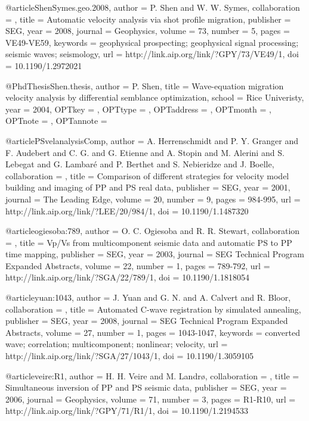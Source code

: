 @article{ShenSymes.geo.2008,
author = {P. Shen and W. W. Symes},
collaboration = {},
title = {Automatic velocity analysis via shot profile migration},
publisher = {SEG},
year = {2008},
journal = {Geophysics},
volume = {73},
number = {5},
pages = {VE49-VE59},
keywords = {geophysical prospecting; geophysical signal processing; seismic waves; seismology},
url = {http://link.aip.org/link/?GPY/73/VE49/1},
doi = {10.1190/1.2972021}
}

@PhdThesis{Shen.thesis,
  author = 	 {P. Shen},
  title = 	 {Wave-equation migration velocity analysis by
                  differential semblance optimization},
  school = 	 {Rice Univeristy},
  year = 	 {2004},
  OPTkey = 	 {},
  OPTtype = 	 {},
  OPTaddress = 	 {},
  OPTmonth = 	 {},
  OPTnote = 	 {},
  OPTannote = 	 {}
}

@article{PSvelanalysisComp,
author = {A. Herrenschmidt and P. Y. Granger and
                  F. Audebert and C. G. and
                  G. Etienne and A. Stopin and M.
                  Alerini and S. Lebegat and G. Lambar\'{e}
                  and P. Berthet and S. Nebieridze and
                  J. Boelle},
collaboration = {},
title = {Comparison of different strategies for velocity model
                  building and imaging of {PP} and {PS} real data},
publisher = {SEG},
year = {2001},
journal = {The Leading Edge},
volume = {20},
number = {9},
pages = {984-995},
url = {http://link.aip.org/link/?LEE/20/984/1},
doi = {10.1190/1.1487320}
}

@article{ogiesoba:789,
author = {O. C. Ogiesoba and R. R. Stewart},
collaboration = {},
title = {Vp/{V}s from multicomponent seismic data and automatic {PS}
                  to {PP} time mapping},
publisher = {SEG},
year = {2003},
journal = {SEG Technical Program Expanded Abstracts},
volume = {22},
number = {1},
pages = {789-792},
url = {http://link.aip.org/link/?SGA/22/789/1},
doi = {10.1190/1.1818054}
}

@article{yuan:1043,
author = {J. Yuan and G. N. and A. Calvert and
                  R. Bloor},
collaboration = {},
title = {Automated {C}-wave registration by simulated annealing},
publisher = {SEG},
year = {2008},
journal = {SEG Technical Program Expanded Abstracts},
volume = {27},
number = {1},
pages = {1043-1047},
keywords = {converted wave; correlation; multicomponent; nonlinear;
                  velocity},
url = {http://link.aip.org/link/?SGA/27/1043/1},
doi = {10.1190/1.3059105}
}

@article{veire:R1,
author = {H. H. Veire and M. Landr\o},
collaboration = {},
title = {Simultaneous inversion of {PP} and {PS} seismic data},
publisher = {SEG},
year = {2006},
journal = {Geophysics},
volume = {71},
number = {3},
pages = {R1-R10},
url = {http://link.aip.org/link/?GPY/71/R1/1},
doi = {10.1190/1.2194533}
}

